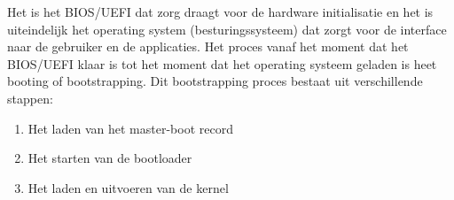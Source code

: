 Het is het BIOS/UEFI dat zorg draagt voor de hardware initialisatie en het is uiteindelijk het operating system (besturingssysteem) dat zorgt voor de interface naar de gebruiker en de applicaties. Het proces vanaf het moment dat het BIOS/UEFI klaar is tot het moment dat het operating systeem geladen is heet booting of bootstrapping. Dit bootstrapping proces bestaat uit verschillende stappen:
\begin{enumerate}
\item Het laden van het master-boot record
\item Het starten van de bootloader
\item Het laden en uitvoeren van de kernel
\end{enumerate}
